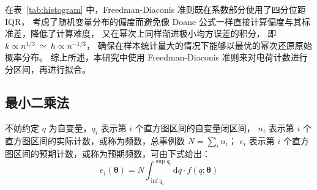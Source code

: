\begin{table}
    \centering
    \caption{多种分区间方法的比较}
    \label{tab:histogram}
\end{table}

在表~\ref{tab:histogram} 中，Freedman-Diaconis 准则既在系数部分使用了四分位距 IQR，
考虑了随机变量分布的偏度而避免像 Doane 公式一样直接计算偏度与其标准差，降低了计算难度，
又在幂次上同样渐进极小均方误差的积分\cite{freedmanHistogramDensityEstimator1981}，
即 $k\propto n^{1/3}\ \simeq\ h\propto n^{-1/3}$，
确保在样本统计量大的情况下能够以最优的幂次还原原始概率分布。
综上所述，本研究中使用 Freedman-Diaconis 准则来对电荷计数进行分区间，再进行拟合。

\subsection{最小二乘法}
不妨约定 $q$ 为自变量，$q_i$ 表示第 $i$ 个直方图区间的自变量闭区间，
$n_i$ 表示第 $i$ 个直方图区间的实际计数，或称为频数，总事例数 $N=\sum_{i}n_i$；
$e_i$ 表示第 $i$ 个直方图区间的预期计数，或称为预期频数，可由下式给出：
\begin{equation}
    e_i(\boldsymbol{\theta}) = N\int_{\inf q_i}^{\sup q_i}\mathrm{d}q\cdot f(q;\boldsymbol{\theta})
\end{equation}

